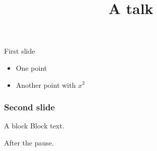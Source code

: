 \documentclass{beamer}
\title{A talk}
\begin{document}
\begin{frame}
\titlepage
\end{frame}
\begin{frame}{First slide}
\begin{itemize}
\item One point
\item Another point with $x^2$
\end{itemize}
\end{frame}
\begin{frame}
\frametitle{Second slide}
\begin{block}{A block}
Block text.
\end{block}
\pause
After the pause.
\end{frame}
\end{document}
